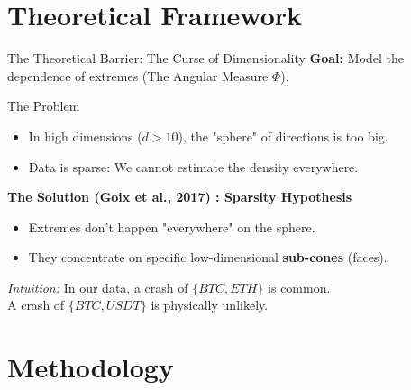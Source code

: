 \documentclass{beamer}
\begin{document}
\section{Theoretical Framework}
\begin{frame}{The Theoretical Barrier: The Curse of Dimensionality}
    \textbf{Goal:} Model the dependence of extremes (The Angular Measure $\Phi$).
    
    \begin{alertblock}{The Problem}
    \begin{itemize}
        \item In high dimensions ($d > 10$), the "sphere" of directions is too big.
        \item Data is sparse: We cannot estimate the density everywhere.
    \end{itemize}
    \end{alertblock}

    \textbf{The Solution (Goix et al., 2017) \cite{GOIX201712}: Sparsity Hypothesis}
    \begin{itemize}
        \item Extremes don't happen "everywhere" on the sphere.
        \item They concentrate on specific low-dimensional \textbf{sub-cones} (faces).
    \end{itemize}
    
    \vspace{0.3cm}
    \centering
    \textit{Intuition:} In our data, a crash of $\{BTC, ETH\}$ is common.\\ A crash of $\{BTC, USDT\}$ is physically unlikely.
\end{frame}

\section{Methodology}
\end{document}
